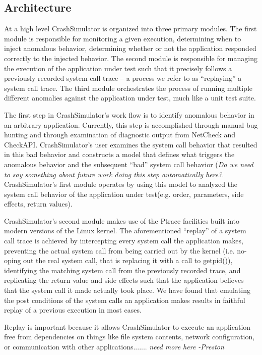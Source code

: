     \subsection{Architecture}
        
    At a high level CrashSimulator is organized into three primary modules. The first module is responsible for
    monitoring a given execution, determining when to inject anomalous behavior, determining whether or not the
    application responded correctly to the injected behavior. The second module is responsible for managing the
    execution of the application under test such that it precisely follows a previously recorded system call trace -- a
    process we refer to as ``replaying'' a system call trace. The third module orchestrates the process of running
    multiple different anomalies against the application under test, much like a unit test suite.
        
    The first step in CrashSimulator's work flow is to identify anomalous behavior in an arbitrary application.
    Currently, this step is accomplished through manual bug hunting and through examination of diagnostic output from
    NetCheck and CheckAPI. CrashSimulator's user examines the system call behavior that resulted in this bad behavior
    and constructs a model that defines what triggers the anomalous behavior and the subsequent ``bad'' system call
    behavior (\emph{Do we need to say something about future work doing this step automatically here?}.
    CrashSimulator's first module operates by using this model to analyzed the system call behavior of the application
    under test(e.g. order, parameters, side effects, return values).
        
    CrashSimulator's second module makes use of the Ptrace facilities built into modern versions of the Linux
    kernel. The aforementioned ``replay'' of a system call trace is achieved by intercepting every system call the
    application makes, preventing the actual system call from being carried out by the kernel (i.e. no-oping out the
    real system call, that is replacing it with a call to getpid()), identifying the matching system call from the
    previously recorded trace, and replicating the return value and side effects such that the application believes that
    the system call it made actually took place. We have found that emulating the post conditions of the system calls an
    application makes results in faithful replay of a previous execution in most cases.

    Replay is important because it allows CrashSimulator to execute an application free from dependencies on things like
    file system contents, network configuration, or communication with other applications....... \emph{need more here
      -Preston}

